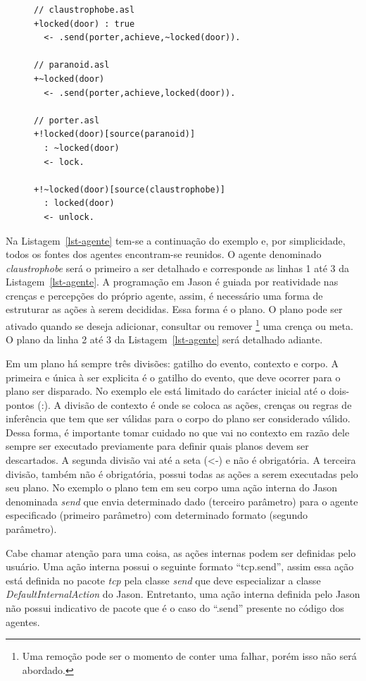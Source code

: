 \lstset{linewidth=75mm}
\begin{figure}
	\begin{lstlisting}[frame=trbl, caption=Agentes em ASL, label=lst-agente]
// claustrophobe.asl
+locked(door) : true
  <- .send(porter,achieve,~locked(door)).

// paranoid.asl
+~locked(door)
  <- .send(porter,achieve,locked(door)).

// porter.asl
+!locked(door)[source(paranoid)]
  : ~locked(door)
  <- lock.

+!~locked(door)[source(claustrophobe)]
  : locked(door)
  <- unlock.
	\end{lstlisting}
\end{figure}
%
Na Listagem~\ref{lst-agente} tem-se a continuação do exemplo e, por
simplicidade, todos os fontes dos agentes encontram-se reunidos. O agente denominado
\emph{claustrophobe} será o primeiro a ser detalhado e corresponde as linhas 1 até 3
da Listagem~\ref{lst-agente}. A programação em Jason é
guiada por reatividade nas crenças e percepções do próprio agente, assim, é necessário
uma forma de estruturar as ações à serem decididas. Essa forma é o plano.
O plano pode ser ativado quando se deseja adicionar, consultar ou remover \footnote{Uma remoção pode ser o momento de conter uma falhar, porém isso não será abordado.}
 uma crença ou meta. O plano da linha 2 até 3 da
Listagem~\ref{lst-agente} será detalhado adiante.

Em um plano há sempre três divisões: gatilho do evento, contexto e corpo.
A primeira e única à ser explicita é o gatilho do evento, que deve ocorrer para
o plano ser disparado. No exemplo ele está limitado do carácter inicial até
o dois-pontos (:). A divisão de contexto é onde se coloca as ações, crenças
ou regras de inferência que tem que ser válidas para o corpo do plano ser
considerado válido. Dessa forma, é
importante tomar cuidado no que vai no contexto em razão dele sempre ser
executado previamente para definir quais planos devem ser descartados.
A segunda divisão vai até a seta (<-) e não é obrigatória.
A terceira divisão, também não é obrigatória, possui todas as ações a serem executadas pelo
seu plano. No exemplo o plano tem em seu corpo uma ação interna do Jason
denominada \emph{send} que envia determinado dado (terceiro parâmetro) para o
agente especificado (primeiro parâmetro) com determinado formato (segundo parâmetro).

Cabe chamar atenção para uma coisa, as ações internas podem ser definidas pelo
usuário. Uma ação interna possui o seguinte formato ``tcp.send'', assim essa
ação está definida no pacote \emph{tcp} pela classe \emph{send} que
deve especializar a classe \emph{DefaultInternalAction} do Jason.
Entretanto, uma ação interna definida pelo Jason não possui indicativo de
pacote que é o caso do ``.send'' presente no código dos agentes.

